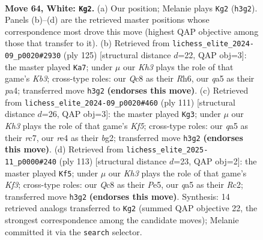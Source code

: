 \documentclass[11pt]{article}
\begin{document}
\clearpage

\begin{figure}[p]\centering
\begin{subfigure}{0.46\textwidth}\centering
\resizebox{\linewidth}{!}{%
\newchessgame
\chessboard[
  setfen={2Q5/8/5pk1/q2p4/4r3/6PK/7P/8 w - - 8 64},
  showmover=false,
  pgfstyle=straightmove, color=movearrow, markmove={h3-g2}
]}
\caption{}
\end{subfigure}\hfill
\begin{subfigure}{0.46\textwidth}\centering
\resizebox{\linewidth}{!}{%
\newchessgame
\chessboard[
  setfen={8/1p6/pk5r/4R3/P7/K1N5/8/8 b - - 28 63},
  showmover=false,
  pgfstyle=straightmove, color=movearrow, markmove={b6-a7}
]}
\caption{}
\end{subfigure}
\\[4pt]
\begin{subfigure}{0.46\textwidth}\centering
\resizebox{\linewidth}{!}{%
\newchessgame
\chessboard[
  setfen={1K6/2R5/4q3/1P3p2/5kp1/8/6B1/8 b - - 2 56},
  showmover=false,
  pgfstyle=straightmove, color=movearrow, markmove={f4-g3}
]}
\caption{}
\end{subfigure}\hfill
\begin{subfigure}{0.46\textwidth}\centering
\resizebox{\linewidth}{!}{%
\newchessgame
\chessboard[
  setfen={8/5p2/5kp1/4p3/4R3/5PK1/2r5/8 b - - 3 57},
  showmover=false,
  pgfstyle=straightmove, color=movearrow, markmove={f6-f5}
]}
\caption{}
\end{subfigure}
\caption{\textbf{Move 64, White: \texttt{Kg2}.} (a) Our position; Melanie plays \texttt{Kg2} (\texttt{h3g2}). Panels (b)--(d) are the retrieved master positions whose correspondence most drove this move (highest QAP objective among those that transfer to it). (b) Retrieved from \texttt{lichess\_elite\_2024-09\_p0020\#2930} (ply 125) [structural distance $d$=22, QAP obj=3]: the master played \texttt{Ka7}; under $\mu$ our \emph{Kh3} plays the role of that game's \emph{Kb3}; cross-type roles: our \emph{Q}c8 as their \emph{R}h6, our \emph{q}a5 as their \emph{p}a4; transferred move \texttt{h3g2} \textbf{(endorses this move)}. (c) Retrieved from \texttt{lichess\_elite\_2024-09\_p0020\#460} (ply 111) [structural distance $d$=26, QAP obj=3]: the master played \texttt{Kg3}; under $\mu$ our \emph{Kh3} plays the role of that game's \emph{Kf5}; cross-type roles: our \emph{q}a5 as their \emph{r}c7, our \emph{r}e4 as their \emph{b}g2; transferred move \texttt{h3g2} \textbf{(endorses this move)}. (d) Retrieved from \texttt{lichess\_elite\_2025-11\_p0000\#240} (ply 113) [structural distance $d$=23, QAP obj=2]: the master played \texttt{Kf5}; under $\mu$ our \emph{Kh3} plays the role of that game's \emph{Kf3}; cross-type roles: our \emph{Q}c8 as their \emph{P}e5, our \emph{q}a5 as their \emph{R}c2; transferred move \texttt{h3g2} \textbf{(endorses this move)}. Synthesis: 14 retrieved analogs transferred to \texttt{Kg2} (summed QAP objective 22, the strongest correspondence among the candidate moves); Melanie committed it via the \texttt{search} selector.}
\label{fig:thought-m126}
\end{figure}
\end{document}
